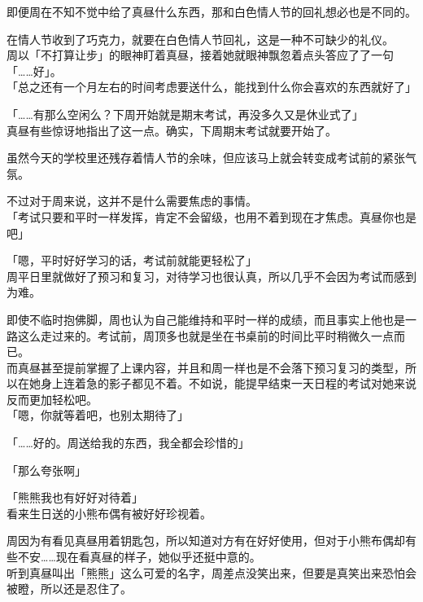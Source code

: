 即便周在不知不觉中给了真昼什么东西，那和白色情人节的回礼想必也是不同的。

在情人节收到了巧克力，就要在白色情人节回礼，这是一种不可缺少的礼仪。\\

周以「不打算让步」的眼神盯着真昼，接着她就眼神飘忽着点头答应了了一句「……好」。\\

「总之还有一个月左右的时间考虑要送什么，能找到什么你会喜欢的东西就好了」

「……有那么空闲么？下周开始就是期末考试，再没多久又是休业式了」\\

真昼有些惊讶地指出了这一点。确实，下周期末考试就要开始了。

虽然今天的学校里还残存着情人节的余味，但应该马上就会转变成考试前的紧张气氛。

不过对于周来说，这并不是什么需要焦虑的事情。\\

「考试只要和平时一样发挥，肯定不会留级，也用不着到现在才焦虑。真昼你也是吧」

「嗯，平时好好学习的话，考试前就能更轻松了」\\

周平日里就做好了预习和复习，对待学习也很认真，所以几乎不会因为考试而感到为难。

即使不临时抱佛脚，周也认为自己能维持和平时一样的成绩，而且事实上他也是一路这么走过来的。考试前，周顶多也就是坐在书桌前的时间比平时稍微久一点而已。\\

而真昼甚至提前掌握了上课内容，并且和周一样也是不会落下预习复习的类型，所以在她身上连着急的影子都见不着。不如说，能提早结束一天日程的考试对她来说反而更加轻松吧。\\

「嗯，你就等着吧，也别太期待了」

「……好的。周送给我的东西，我全都会珍惜的」

「那么夸张啊」

「熊熊我也有好好对待着」\\

看来生日送的小熊布偶有被好好珍视着。

周因为有看见真昼用着钥匙包，所以知道对方有在好好使用，但对于小熊布偶却有些不安……现在看真昼的样子，她似乎还挺中意的。\\

听到真昼叫出「熊熊」这么可爱的名字，周差点没笑出来，但要是真笑出来恐怕会被瞪，所以还是忍住了。\\


